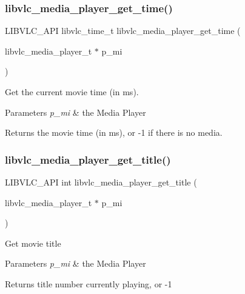 \subsubsection{\texorpdfstring{libvlc\+\_\+media\+\_\+player\+\_\+get\+\_\+time()}{libvlc\_media\_player\_get\_time()}}
{\footnotesize\ttfamily L\+I\+B\+V\+L\+C\+\_\+\+A\+PI libvlc\+\_\+time\+\_\+t libvlc\+\_\+media\+\_\+player\+\_\+get\+\_\+time (\begin{DoxyParamCaption}\item[{libvlc\+\_\+media\+\_\+player\+\_\+t $\ast$}]{p\+\_\+mi }\end{DoxyParamCaption})}

Get the current movie time (in ms).


\begin{DoxyParams}{Parameters}
{\em p\+\_\+mi} & the Media Player \\
\hline
\end{DoxyParams}
\begin{DoxyReturn}{Returns}
the movie time (in ms), or -\/1 if there is no media. 
\end{DoxyReturn}
\mbox{\label{group__libvlc__media__player_gafdaefc462fcab5c4fdd862d5ee3a226d}} 
\subsubsection{\texorpdfstring{libvlc\+\_\+media\+\_\+player\+\_\+get\+\_\+title()}{libvlc\_media\_player\_get\_title()}}
{\footnotesize\ttfamily L\+I\+B\+V\+L\+C\+\_\+\+A\+PI int libvlc\+\_\+media\+\_\+player\+\_\+get\+\_\+title (\begin{DoxyParamCaption}\item[{libvlc\+\_\+media\+\_\+player\+\_\+t $\ast$}]{p\+\_\+mi }\end{DoxyParamCaption})}

Get movie title


\begin{DoxyParams}{Parameters}
{\em p\+\_\+mi} & the Media Player \\
\hline
\end{DoxyParams}
\begin{DoxyReturn}{Returns}
title number currently playing, or -\/1 
\end{DoxyReturn}
\mbox{\label{group__libvlc__media__player_gaa82c224660d1c88588dc9391be905396}} 
